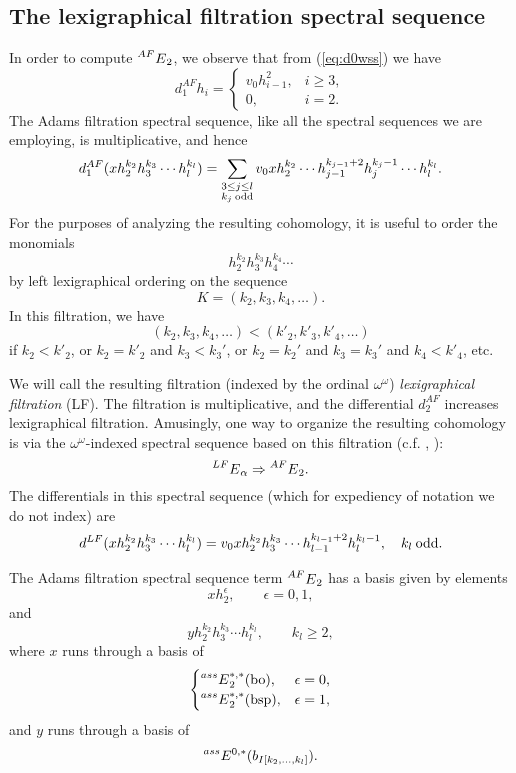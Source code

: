 \subsection*{The lexigraphical filtration spectral sequence}

In order to compute $\prescript{AF}{}{E}_2$, we observe that from (\ref{eq:d0wss}) we have
$$
d_1^{AF}h_i = 
\begin{cases}
v_0 h_{i-1}^2, & i \ge 3, \\
0, & i = 2.
\end{cases}
$$
The Adams filtration spectral sequence, like all the spectral sequences we are employing, is multiplicative, and hence
$$ d_1^{AF}(xh_2^{k_2}h_3^{k_3}\cdots h_l^{k_l}) = \sum_{\substack{3 \le j \le l \\ k_j \: \mathrm{odd}}} v_0xh_2^{k_2} \cdots h_{j-1}^{k_{j-1}+2} h_j^{k_j-1} \cdots h_l^{k_l}. $$
For the purposes of analyzing the resulting cohomology, it is useful to order the monomials 
$$ h_2^{k_2} h_3^{k_3} h_4^{k_4} \cdots $$
by left lexigraphical ordering on the sequence 
$$
K = (k_2, k_3, k_4, \ldots ).
$$
In this filtration, we have
$$ (k_2, k_3, k_4, \ldots) < (k'_2, k'_3, k'_4, \ldots) $$
if $k_2 < k'_2$, or $k_2 = k'_2$ and $k_3 < k_3'$, or $k_2 = k_2'$ and $k_3=k_3'$ and $k_4 < k'_4$, etc.

We will call the resulting filtration (indexed by the ordinal $\omega^\omega$) \emph{lexigraphical filtration} (LF).  
The filtration is multiplicative, and the differential $d_2^{AF}$ increases lexigraphical filtration.  Amusingly, one way to organize the resulting cohomology is via the $\omega^\omega$-indexed spectral sequence based on this filtration (c.f. \cite{Hu}, \cite{Matschke}):
$$ \prescript{LF}{}{E}_\alpha \Rightarrow \prescript{AF}{}{E}_2. $$
The differentials in this spectral sequence (which for expediency of notation we do not index) are
\begin{equation}\label{eq:dLF} d^{LF}(x h_2^{k_2} h_3^{k_3} \cdots h_l^{k_l}) = v_0 x h_2^{k_2} h_3^{k_3} \cdots h_{l-1}^{k_{l-1}+2}h_{l}^{k_l-1}, \quad k_l \: \mathrm{odd}.
\end{equation}

\begin{prop}\label{prop:E2AF}
The Adams filtration spectral sequence term $\prescript{AF}{}{E}_2$ has a basis given by elements
$$ x h_2^\epsilon, \qquad \epsilon = 0,1, $$
and
$$ y h_2^{k_2} h_3^{k_3} \cdots h_{l}^{k_l}, \qquad k_l \ge 2, $$
where $x$ runs through a basis of 
$$
\begin{cases} \prescript{ass}{}{E}_2^{*,*}(\mathrm{bo}), & \epsilon = 0, \\ \prescript{ass}{}{E}_2^{*,*}(\mathrm{bsp}), & \epsilon = 1, \end{cases}
$$ and $y$ runs through a basis of
$$ \prescript{ass}{}{E}^{0,*}(b_{I[k_2, \ldots, k_l]}). $$
\end{prop}

